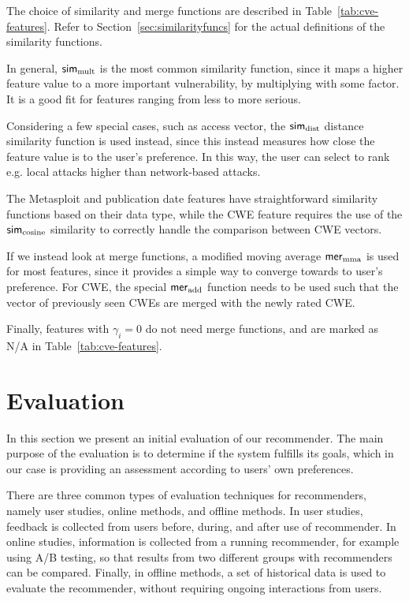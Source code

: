 {The choice of similarity and merge functions are described in Table~\ref{tab:cve-features}. Refer to Section~\ref{sec:similarityfuncs} for the actual definitions of the similarity functions.

In general, $\mathsf{sim}_\text{mult}$ is the most common similarity function, since it maps a higher feature value to a more important vulnerability, by multiplying with some factor. It is a good fit for features ranging from less to more serious.

Considering a few special cases, such as access vector, the $\mathsf{sim}_\text{dist}$ distance similarity function is used instead, since this instead measures how close the feature value is to the user's preference. In this way, the user can select to rank e.g. local attacks higher than network-based attacks.

The Metasploit and publication date features have straightforward similarity functions based on their data type, while the CWE feature requires the use of the $\mathsf{sim}_\text{cosine}$ similarity to correctly handle the comparison between CWE vectors.

If we instead look at merge functions, a modified moving average $\mathsf{mer}_\text{mma}$ is used for most features, since it provides a simple way to converge towards to user's preference. For CWE, the special $\mathsf{mer}_\text{add}$ function needs to be used such that the vector of previously seen CWEs are merged with the newly rated CWE.

Finally, features with $\gamma_i=0$ do not need merge functions, and are marked as N/A in Table~\ref{tab:cve-features}.

\section{Evaluation} \label{sec:recsys:evaluation}
In this section we present an initial evaluation of our recommender.
The main purpose of the evaluation is to determine if the system fulfills its goals, which in our case is providing an assessment according to users' own preferences.

There are three common types of evaluation techniques for recommenders, namely user studies, online methods, and offline methods.
In user studies, feedback is collected from users before, during, and after use of recommender.
In online studies, information is collected from a running recommender, for example using A/B testing, so that results from two different groups with recommenders can be compared.
Finally, in offline methods, a set of historical data is used to evaluate the recommender, without requiring ongoing interactions from users.

}
